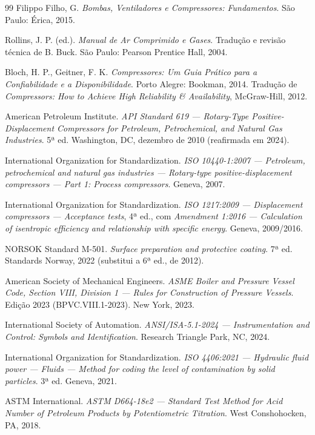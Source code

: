 \documentclass[12pt,a4paper]{article}
\numberwithin{equation}{section}
\numberwithin{table}{section}
\numberwithin{figure}{section}
\begin{document}
{\begin{thebibliography}{99}
 Filippo Filho, G. \textit{Bombas, Ventiladores e Compressores: Fundamentos}. São Paulo: Érica, 2015.

 Rollins, J. P. (ed.). \textit{Manual de Ar Comprimido e Gases}. Tradução e revisão técnica de B. Buck. São Paulo: Pearson Prentice Hall, 2004.

 Bloch, H. P., Geitner, F. K. \textit{Compressores: Um Guia Prático para a Confiabilidade e a Disponibilidade}. Porto Alegre: Bookman, 2014. Tradução de \textit{Compressors: How to Achieve High Reliability \& Availability}, McGraw-Hill, 2012.

 American Petroleum Institute. \textit{API Standard 619 — Rotary-Type Positive-Displacement Compressors for Petroleum, Petrochemical, and Natural Gas Industries}. 5ª ed. Washington, DC, dezembro de 2010 (reafirmada em 2024).

 International Organization for Standardization. \textit{ISO 10440-1:2007 — Petroleum, petrochemical and natural gas industries — Rotary-type positive-displacement compressors — Part 1: Process compressors}. Geneva, 2007.

 International Organization for Standardization. \textit{ISO 1217:2009 — Displacement compressors — Acceptance tests}, 4ª ed., com \textit{Amendment 1:2016 — Calculation of isentropic efficiency and relationship with specific energy}. Geneva, 2009/2016.

 NORSOK Standard M-501. \textit{Surface preparation and protective coating}. 7ª ed. Standards Norway, 2022 (substitui a 6ª ed., de 2012).

 American Society of Mechanical Engineers. \textit{ASME Boiler and Pressure Vessel Code, Section VIII, Division 1 — Rules for Construction of Pressure Vessels}. Edição 2023 (BPVC.VIII.1-2023). New York, 2023.

 International Society of Automation. \textit{ANSI/ISA-5.1-2024 — Instrumentation and Control: Symbols and Identification}. Research Triangle Park, NC, 2024.

 International Organization for Standardization. \textit{ISO 4406:2021 — Hydraulic fluid power — Fluids — Method for coding the level of contamination by solid particles}. 3ª ed. Geneva, 2021.

 ASTM International. \textit{ASTM D664-18e2 — Standard Test Method for Acid Number of Petroleum Products by Potentiometric Titration}. West Conshohocken, PA, 2018.


\end{thebibliography}}
\end{document}
